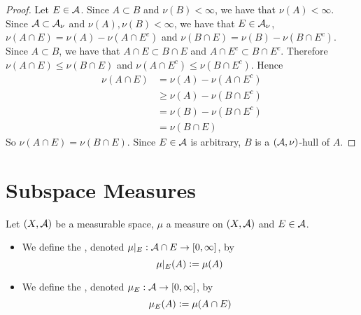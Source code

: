\documentclass{book}
\begin{document}
	\begin{proof}
		Let $E \in \mathcal{A}$. Since $A \subset B$ and $\nu(B) < \infty$, we have that $\nu(A) < \infty$. Since $\mathcal{A} \subset \mathcal{A}_{\nu}$ and $\nu(A), \nu(B) < \infty$, we have that $E \in \mathcal{A}_{\nu}$, $\nu(A \cap E) = \nu(A) - \nu(A \cap E^c)$ and $\nu(B \cap E) = \nu(B) - \nu(B \cap E^c)$. Since $A \subset B$, we have that $A \cap E \subset B \cap E$ and $A \cap E^c \subset B \cap E^c$. Therefore $\nu(A \cap E) \leq \nu(B \cap E)$ and $\nu(A \cap E^c) \leq \nu(B \cap E^c)$. Hence
		\begin{align*}
			\nu(A \cap E)
			& = \nu(A) - \nu(A \cap E^c) \\
			& \geq \nu(A) - \nu(B \cap E^c) \\
			& = \nu(B) - \nu(B \cap E^c) \\
			& = \nu(B \cap E)
		\end{align*}
		So $\nu(A \cap E) = \nu(B \cap E)$. Since $E \in \mathcal{A}$ is arbitrary, $B$ is a $(\mathcal{A}, \nu)$-hull of $A$.
	\end{proof}

	
	
	
	
	
	
	
	
	
	
	
	
	
	
	
	
	
	
	
	
	
	
	
	
	
	
	
	
	
	
	\newpage
	\section{Subspace Measures}
	
	\begin{defn}  
		Let $(X, \mathcal{A})$ be a measurable space, $\mu$ a measure on $(X, \mathcal{A})$ and $E \in \mathcal{A}$. 
		\begin{itemize}
			\item We define the , denoted $\mu|_E: \mathcal{A} \cap E \rightarrow [0,\infty]$, by 
			$$\mu|_E(A) \vcentcolon= \mu(A)$$
			\item We define the , denoted $\mu_E: \mathcal{A} \rightarrow [0,\infty]$, by 
			$$\mu_E(A) \vcentcolon= \mu(A \cap E)$$
		\end{itemize}
	\end{defn}
\end{document}
